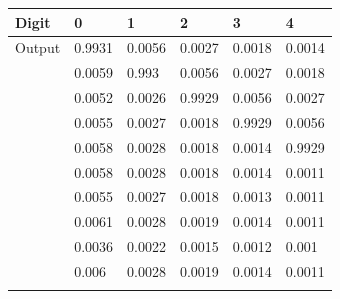 \documentclass[letterpaper,11pt]{article}
\begin{document}
\begin{table}[H]
\centering
\begin{tabular}{l|lllll}
Digit  & 0                             & 1                             & 2                             & 3                             & 4                             \\ \hline
Output & {\color[HTML]{3531FF} 0.9931} & 0.0056                        & 0.0027                        & 0.0018                        & 0.0014                        \\
       & 0.0059                        & {\color[HTML]{3531FF} 0.993}  & 0.0056                        & 0.0027                        & 0.0018                        \\
       & 0.0052                        & 0.0026                        & {\color[HTML]{3531FF} 0.9929} & 0.0056                        & 0.0027                        \\
       & 0.0055                        & 0.0027                        & 0.0018                        & {\color[HTML]{3531FF} 0.9929} & 0.0056                        \\
       & 0.0058                        & 0.0028                        & 0.0018                        & 0.0014                        & {\color[HTML]{3531FF} 0.9929} \\
       & 0.0058                        & 0.0028                        & 0.0018                        & 0.0014                        & 0.0011                        \\
       & 0.0055                        & 0.0027                        & 0.0018                        & 0.0013                        & 0.0011                        \\
       & 0.0061                        & 0.0028                        & 0.0019                        & 0.0014                        & 0.0011                        \\
       & 0.0036                        & 0.0022                        & 0.0015                        & 0.0012                        & 0.001                         \\
       & 0.006                         & 0.0028                        & 0.0019                        & 0.0014                        & 0.0011                        \\
       &                               &                               &                               &                               &                               \\

\end{tabular}
\end{table}
\end{document}
